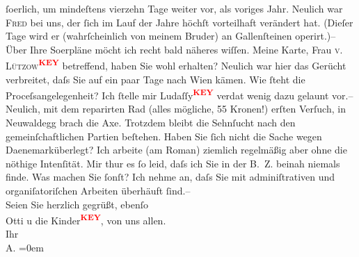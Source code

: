 \begin{ledgroupsized}[t]{13cm}
                  ſo{\geminationm}erlich, um mindeſtens vierzehn Tage weiter vor,
               als voriges Jahr. Neulich war \textsc{Fred} bei uns, der ſich im Lauf der Jahre höchſt vorteilhaft verändert hat. (Dieſer
               {\pb}Tage wird er (wahrſcheinlich
               von meinem Bruder) an
               Gallenſteinen operirt.)– \pend
           \pstart
           Über Ihre So{\geminationm}erpläne möcht ich recht bald näheres
               wiſſen. Meine Karte, Frau \textsc{v. Lützow\textcolor{red}{\textsuperscript{\textbf{KEY}}}} betreffend, haben Sie wohl erhalten? Neulich war hier das Gerücht verbreitet,
               daſs Sie auf ein paar Tage nach Wien kämen. Wie
               ſteht die Proceſsangelegenheit? Ich ſtelle mir Ludaſſy\textcolor{red}{\textsuperscript{\textbf{KEY}}}
                  verda{\geminationm}t wenig dazu gelaunt vor.– \pend
           \pstart
           Neulich, mit dem reparirten Rad (alles mögliche, 55 Kronen!) erſten Verſuch, in Neuwaldegg brach die Axe. Trotzdem bleibt die
               Sehnſucht nach den gemeinſchaftlichen Partien beſtehen. Haben Sie ſich nicht die
               Sache wegen Daenemarküberlegt? \pend
           \pstart
           Ich arbeite (am Roman) ziemlich
               regelmäßig aber ohne die nöthige Intenſität. Mir thur es ſo leid, daſs ich Sie in der
               B. Z. beinah niemals finde. Was machen Sie ſonſt?
               Ich nehme an, daſs Sie mit adminiſtrativen und organiſatoriſchen Arbeiten überhäuft
               ſind.– {\\[\baselineskip]}Seien Sie herzlich gegrüßt, ebenſo {\\[\baselineskip]}Otti u die Kinder\textcolor{red}{\textsuperscript{\textbf{KEY}}}, von uns allen. {\\[\baselineskip]}Ihr {\\[\baselineskip]}\spacefill\mbox{A.}\pend
           \leftskip=0em{}
         
         \endnumbering{}\end{ledgroupsized}\begin{anhang}\end{anhang}\newcommand{\dateiname}{L03004}\newcommand{\titel}{Arthur Schnitzler an Felix Salten, 27. 4. 1906}\newcommand{\editorInnen}{Martin Anton Müller und Laura Untner}
      